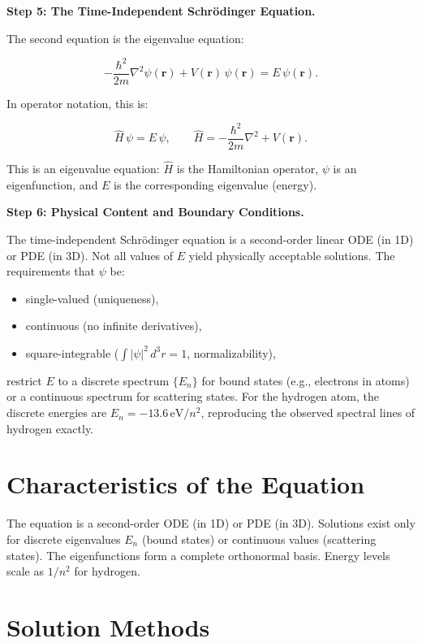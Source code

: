 \textbf{Step 5: The Time-Independent Schr\"odinger Equation.}

The second equation is the eigenvalue equation:

\begin{equation}
-\frac{\hbar^2}{2m}\nabla^2\psi(\mathbf{r}) + V(\mathbf{r})\,\psi(\mathbf{r}) = E\,\psi(\mathbf{r}).
\end{equation}

In operator notation, this is:

\begin{equation}
\boxed{\hat{H}\,\psi = E\,\psi, \qquad \hat{H} = -\frac{\hbar^2}{2m}\nabla^2 + V(\mathbf{r}).}
\end{equation}

This is an eigenvalue equation: $\hat{H}$ is the Hamiltonian operator, $\psi$ is an eigenfunction, and $E$ is the corresponding eigenvalue (energy).

\textbf{Step 6: Physical Content and Boundary Conditions.}

The time-independent Schr\"odinger equation is a second-order linear ODE (in 1D) or PDE (in 3D). Not all values of $E$ yield physically acceptable solutions. The requirements that $\psi$ be:

\begin{itemize}
\item single-valued (uniqueness),
\item continuous (no infinite derivatives),
\item square-integrable ($\int |\psi|^2\,d^3r = 1$, normalizability),
\end{itemize}

restrict $E$ to a discrete spectrum $\{E_n\}$ for bound states (e.g., electrons in atoms) or a continuous spectrum for scattering states. For the hydrogen atom, the discrete energies are $E_n = -13.6\,\text{eV}/n^2$, reproducing the observed spectral lines of hydrogen exactly.

\section*{Characteristics of the Equation}

The equation is a second-order ODE (in 1D) or PDE (in 3D). Solutions exist only for discrete eigenvalues $E_n$ (bound states) or continuous values (scattering states). The eigenfunctions form a complete orthonormal basis. Energy levels scale as $1/n^2$ for hydrogen.
\section*{Solution Methods}

